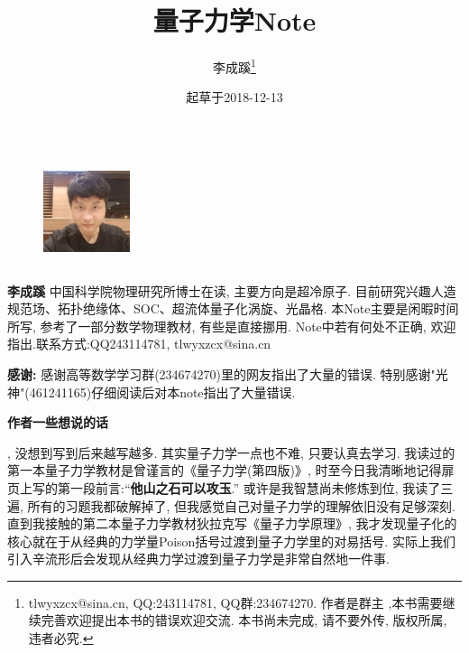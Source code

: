 \documentclass[a4paper,11pt]{book}
\begin{document}
\title{量子力学Note}
\author{李成蹊\footnote{ tlwyxzcx@sina.cn, QQ:243114781, QQ群:234674270. 作者是群主 ,本书需要继续完善欢迎提出本书的错误欢迎交流. 本书尚未完成, 请不要外传, 版权所属, 违者必究.}}
\date{起草于2018-12-13}
\maketitle
\begin{figure}
\includegraphics[width=1in,height=1.25in,clip,keepaspectratio]{P1.jpg}
\end{figure}\par
\textbf{李成蹊} 中国科学院物理研究所博士在读, 主要方向是超冷原子. 目前研究兴趣人造规范场、拓扑绝缘体、SOC、超流体量子化涡旋、光晶格. 本Note主要是闲暇时间所写, 参考了一部分数学物理教材, 有些是直接挪用. Note中若有何处不正确, 欢迎指出.联系方式:QQ243114781, tlwyxzcx@sina.cn\par

\indent\textbf{感谢:} 感谢高等数学学习群(234674270)里的网友指出了大量的错误. 特别感谢"光神"(461241165)仔细阅读后对本note指出了大量错误.
\newpage
\begin{center}
  \textbf{作者一些想说的话}
\end{center}

, 没想到写到后来越写越多. 其实量子力学一点也不难, 只要认真去学习. 我读过的第一本量子力学教材是曾谨言的《量子力学(第四版)》, 时至今日我清晰地记得扉页上写的第一段前言:“\textbf{他山之石可以攻玉}.” 或许是我智慧尚未修炼到位, 我读了三遍, 所有的习题我都破解掉了, 但我感觉自己对量子力学的理解依旧没有足够深刻. 直到我接触的第二本量子力学教材狄拉克写《量子力学原理》, 我才发现量子化的核心就在于从经典的力学量Poison括号过渡到量子力学里的对易括号. 实际上我们引入辛流形后会发现从经典力学过渡到量子力学是非常自然地一件事.
\end{document}
